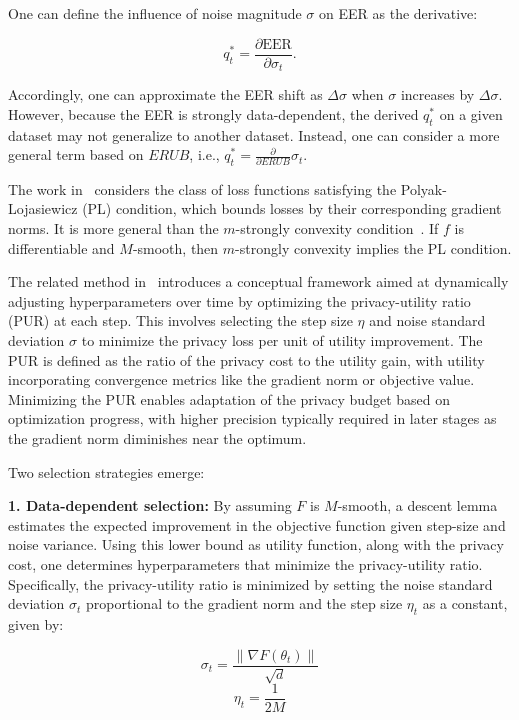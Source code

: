 One can define the influence of noise magnitude \( \sigma \) on EER as the derivative:

\[
q_t^* = \frac{\partial \text{EER}}{\partial \sigma_t}.
\]

Accordingly, one can approximate the EER shift as \( \Delta \sigma \) when \( \sigma \) increases by \( \Delta \sigma \). However, because the EER is strongly data-dependent, the derived \( q_t^* \) on a given dataset may not generalize to another dataset. Instead, one can consider a more general term based on \( ERUB \), i.e., \( q_t^* = \frac{\partial}{\partial ERUB} \sigma_t \).

The work in~\cite{RefWorks:RefID:49-hong2022dynamic} considers the class of loss functions satisfying the Polyak-Lojasiewicz (PL) condition, which bounds losses by their corresponding gradient norms. It is more general than the \( m \)-strongly convexity condition~\cite{RefWorks:RefID:63-polyak1963gradient}. If \( f \) is differentiable and \( M \)-smooth, then \( m \)-strongly convexity implies the PL condition.

The related method in~\cite{RefWorks:RefID:48-fay2023adaptive}  introduces a conceptual framework aimed at dynamically adjusting hyperparameters over time by optimizing the privacy-utility ratio (PUR) at each step. This involves selecting the step size $\eta$ and noise standard deviation $\sigma$ to minimize the privacy loss per unit of utility improvement. The PUR is defined as the ratio of the privacy cost to the utility gain, with utility incorporating convergence metrics like the gradient norm or objective value. Minimizing the PUR enables adaptation of the privacy budget based on optimization progress, with higher precision typically required in later stages as the gradient norm diminishes near the optimum.

Two selection strategies emerge:


\textbf{1. Data-dependent selection:}
   By assuming $F$ is $M$-smooth, a descent lemma estimates the expected improvement in the objective function given step-size and noise variance. Using this lower bound as utility function, along with the privacy cost, one determines hyperparameters that minimize the privacy-utility ratio. Specifically, the privacy-utility ratio is minimized by setting the noise standard deviation $\sigma_t$ proportional to the gradient norm and the step size $\eta_t$ as a constant, given by:
   
   \[ \sigma_t = \frac{\| \nabla F(\theta_t) \|}{\sqrt{d}} \]
   \[ \eta_t = \frac{1}{2M} \]



